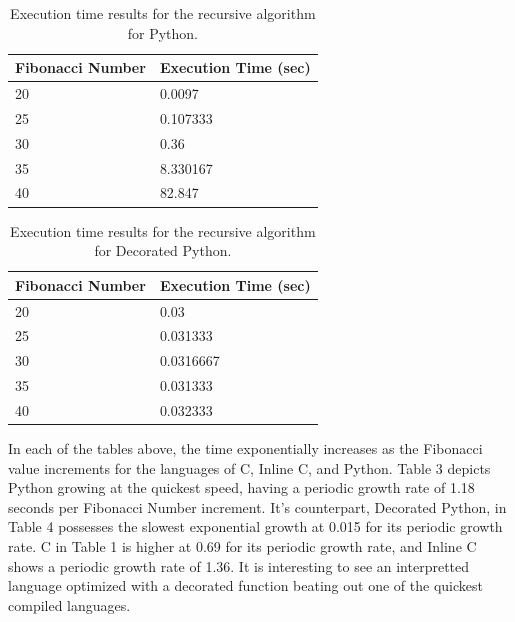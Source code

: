 \documentclass{sig-alternate}
\begin{document}
\begin{scriptsize}
\begin{table}[ht!]
  \centering
  \begin{tabular}{|l|l|}
    \hline
    \textbf{Fibonacci Number} & \textbf{Execution Time (sec)}\\
    \hline
    20 & 0.0097\\
    \hline
    25 & 0.107333\\
	\hline
	30 & 0.36\\
	\hline
	35 & 8.330167\\
	\hline
	40 & 82.847\\
	\hline
\end{tabular}
\caption{Execution time results for the recursive algorithm for Python.}
\label{table:formatting}
\end{table}
\end{scriptsize}

\begin{scriptsize}
\begin{table}[ht!]
  \centering
  \begin{tabular}{|l|l|}
    \hline
    \textbf{Fibonacci Number} & \textbf{Execution Time (sec)}\\
    \hline
    20 & 0.03\\
    \hline
    25 & 0.031333\\
	\hline
	30 & 0.0316667\\
	\hline
	35 & 0.031333\\
	\hline
	40 & 0.032333\\
	\hline
\end{tabular}
\caption{Execution time results for the recursive algorithm for Decorated Python.}
\label{table:formatting}
\end{table}
\end{scriptsize}

In each of the tables above, the time exponentially increases as the Fibonacci value increments for the languages of C, Inline C, and Python. Table 3 depicts Python growing at the quickest speed, having a periodic growth rate of 1.18 seconds per Fibonacci Number increment. It's counterpart, Decorated Python, in Table 4 possesses the slowest exponential growth at 0.015 for its periodic growth rate. C in Table 1 is higher at 0.69 for its periodic growth rate, and Inline C shows a periodic growth rate of 1.36. It is interesting to see an interpretted language optimized with a decorated function beating out one of the quickest compiled languages.
\end{document}
